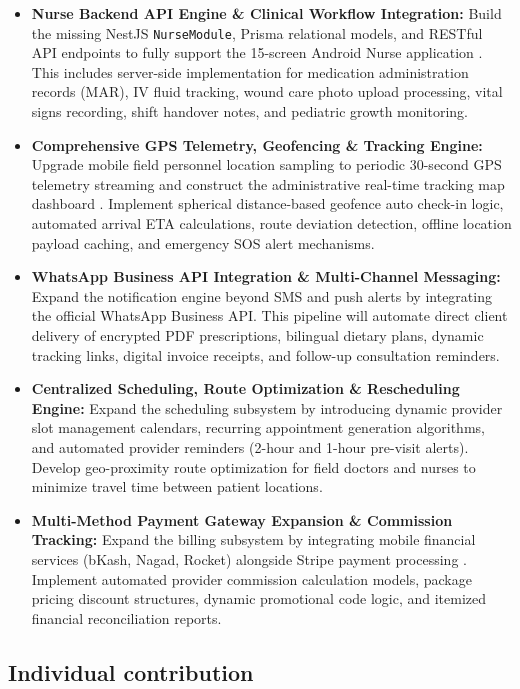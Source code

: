 \documentclass[onecolumn,journal]{IEEEtran}
\begin{document}
	\begin{itemize}
		\item \textbf{Nurse Backend API Engine \& Clinical Workflow Integration:} Build the missing NestJS \texttt{NurseModule}, Prisma relational models, and RESTful API endpoints to fully support the 15-screen Android Nurse application \cite{srs2026}. This includes server-side implementation for medication administration records (MAR), IV fluid tracking, wound care photo upload processing, vital signs recording, shift handover notes, and pediatric growth monitoring.
		\item \textbf{Comprehensive GPS Telemetry, Geofencing \& Tracking Engine:} Upgrade mobile field personnel location sampling to periodic 30-second GPS telemetry streaming and construct the administrative real-time tracking map dashboard \cite{zandbergen2009accuracy}. Implement spherical distance-based geofence auto check-in logic, automated arrival ETA calculations, route deviation detection, offline location payload caching, and emergency SOS alert mechanisms.
		\item \textbf{WhatsApp Business API Integration \& Multi-Channel Messaging:} Expand the notification engine beyond SMS and push alerts by integrating the official WhatsApp Business API. This pipeline will automate direct client delivery of encrypted PDF prescriptions, bilingual dietary plans, dynamic tracking links, digital invoice receipts, and follow-up consultation reminders.
		\item \textbf{Centralized Scheduling, Route Optimization \& Rescheduling Engine:} Expand the scheduling subsystem by introducing dynamic provider slot management calendars, recurring appointment generation algorithms, and automated provider reminders (2-hour and 1-hour pre-visit alerts). Develop geo-proximity route optimization for field doctors and nurses to minimize travel time between patient locations.
		\item \textbf{Multi-Method Payment Gateway Expansion \& Commission Tracking:} Expand the billing subsystem by integrating mobile financial services (bKash, Nagad, Rocket) alongside Stripe payment processing \cite{stripe2024api}. Implement automated provider commission calculation models, package pricing discount structures, dynamic promotional code logic, and itemized financial reconciliation reports.
	\end{itemize}
	
	\subsection{Individual contribution}
	
\end{document}
